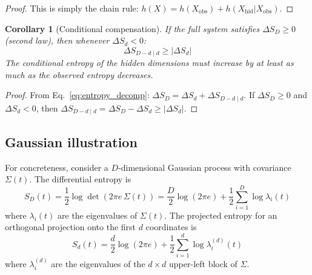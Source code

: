 \documentclass[12pt,a4paper]{article}
\newtheorem{corollary}[theorem]{Corollary}
\begin{document}
\begin{proof}
This is simply the chain rule: $h(X) = h(X_{\mathrm{obs}}) + h(X_{\mathrm{hid}} | X_{\mathrm{obs}})$.
\end{proof}

\begin{corollary}[Conditional compensation]
\label{cor:compensation}
If the full system satisfies $\Delta S_D \geq 0$ (second law), then whenever $\Delta S_d < 0$:
\begin{equation}
\Delta S_{D-d \mid d} \geq |\Delta S_d|
\label{eq:demon}
\end{equation}
The conditional entropy of the hidden dimensions must increase by at least as much as the observed entropy decreases.
\end{corollary}

\begin{proof}
From Eq.~\eqref{eq:entropy_decomp}: $\Delta S_D = \Delta S_d + \Delta S_{D-d \mid d}$.
If $\Delta S_D \geq 0$ and $\Delta S_d < 0$, then $\Delta S_{D-d \mid d} = \Delta S_D - \Delta S_d \geq |\Delta S_d|$.
\end{proof}

\medskip
\noindent{}

\subsection{Gaussian illustration}

For concreteness, consider a $D$-dimensional Gaussian process with covariance $\Sigma(t)$.
The differential entropy is
\begin{equation}
S_D(t) = \frac{1}{2}\log\det\!\left(2\pi e\,\Sigma(t)\right) = \frac{D}{2}\log(2\pi e) + \frac{1}{2}\sum_{i=1}^D \log \lambda_i(t)
\end{equation}
where $\lambda_i(t)$ are the eigenvalues of $\Sigma(t)$.
The projected entropy for an orthogonal projection onto the first $d$ coordinates is
\begin{equation}
S_d(t) = \frac{d}{2}\log(2\pi e) + \frac{1}{2}\sum_{i=1}^d \log \lambda^{(d)}_i(t)
\end{equation}
where $\lambda^{(d)}_i$ are the eigenvalues of the $d \times d$ upper-left block of $\Sigma$.
\end{document}
